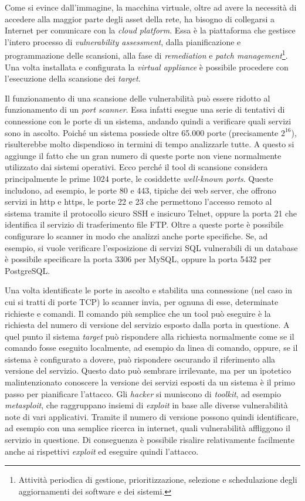 \documentclass[target=bach,aauheader=]{thud}
\begin{document}
Come si evince dall’immagine, la macchina virtuale, oltre ad avere la necessità di accedere alla maggior parte degli asset della rete, ha bisogno di collegarsi a Internet per comunicare con la \textit{cloud platform}. Essa è la piattaforma che gestisce l’intero processo di \textit{vulnerability assessment}, dalla pianificazione e programmazione delle scansioni, alla fase di \textit{remediation} e \textit{patch management}\footnote{Attività periodica di gestione, prioritizzazione, selezione e schedulazione degli aggiornamenti dei software e dei sistemi.}. Una volta installata e configurata la \textit{virtual appliance} è possibile procedere con l’esecuzione della scansione dei \textit{target}.

Il funzionamento di una scansione delle vulnerabilità può essere ridotto al funzionamento di un \textit{port scanner}. Essa infatti esegue una serie di tentativi di connessione con le porte di un sistema, andando quindi a verificare quali servizi sono in ascolto. Poiché un sistema possiede oltre 65.000 porte (precisamente \(2^{16}\)), risulterebbe molto dispendioso in termini di tempo analizzarle tutte. A questo si aggiunge il fatto che un gran numero di queste porte non viene normalmente utilizzato dai sistemi operativi. Ecco perché il tool di scansione considera principalmente le prime 1024 porte, le cosiddette \textit{well-known ports}. Queste includono, ad esempio, le porte 80 e 443, tipiche dei web server, che offrono servizi in http e https, le porte 22 e 23 che permettono l’accesso remoto al sistema tramite il protocollo sicuro SSH e insicuro Telnet, oppure la porta 21 che identifica il servizio di trasferimento file FTP. Oltre a queste porte è possibile configurare lo scanner in modo che analizzi anche porte specifiche. Se, ad esempio, si vuole verificare l’esposizione di servizi SQL vulnerabili di un database è possibile specificare la porta 3306 per MySQL, oppure la porta 5432 per PostgreSQL.

Una volta identificate le porte in ascolto e stabilita una connessione (nel caso in cui si tratti di porte TCP) lo scanner invia, per ognuna di esse, determinate richieste e comandi. Il comando più semplice che un tool può eseguire è la richiesta del numero di versione del servizio esposto dalla porta in questione. A quel punto il sistema \textit{target} può rispondere alla richiesta normalmente come se il comando fosse eseguito localmente, ad esempio da linea di comando, oppure, se il sistema è configurato a dovere, può rispondere oscurando il riferimento alla versione del servizio. Questo dato può sembrare irrilevante, ma per un ipotetico malintenzionato conoscere la versione dei servizi esposti da un sistema è il primo passo per pianificare l’attacco. Gli \textit{hacker} si muniscono di \textit{toolkit}, ad esempio \textit{metasploit}, che raggruppano insiemi di \textit{exploit} in base alle diverse vulnerabilità note di vari applicativi. Tramite il numero di versione possono quindi identificare, ad esempio con una semplice ricerca in internet, quali vulnerabilità affliggono il servizio in questione. Di conseguenza è possibile risalire relativamente facilmente anche ai rispettivi \textit{exploit} ed eseguire quindi l’attacco.
\end{document}
